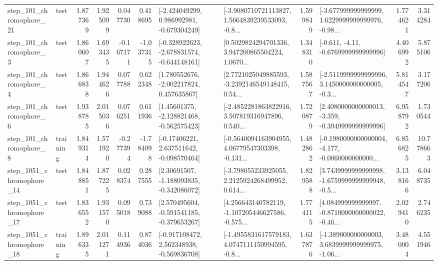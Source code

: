 \begin{tabular}{llrrrrllrlrr}
  step\_101\_chromophore\_21 &      test &      1.877369 &    1.925099 &      0.047730 &  0.418695 &   [-2.424049299, 0.986992981, -0.679304249] &  [-3.9080710721113827, 1.5664839239533093, -0.8... &       1.599849 &  [-3.677999999999999, 1.6229999999999976, -0.98... &            1.774621 &          3.314284 \\
   step\_101\_chromophore\_3 &      test &      1.860607 &    1.693435 &     -0.167171 & -1.037315 &  [-0.328922623, -2.678831574, -0.644148161] &  [0.5029824294701336, 3.947200865504224, 1.0670... &       1.348310 &               [-0.611, -4.11, -0.6769999999999996] &            4.406992 &          5.875106 \\
   step\_101\_chromophore\_4 &      test &      1.866838 &    1.944626 &      0.077788 &  0.622348 &    [1.780552676, -2.002217824, 0.457635867] &  [2.7721025049885593, -3.2392146549148415, 0.54... &       1.587567 &  [-2.5119999999999996, 3.1450000000000005, -0.3... &            5.814547 &          3.177206 \\
   step\_101\_chromophore\_6 &      test &      1.938785 &    2.015036 &      0.076251 &  0.611936 &    [1.45601375, -2.128821468, -0.562575423] &  [-2.4852281863822916, 3.507819316947896, 0.540... &       1.720879 &  [2.4080000000000013, -3.359, -0.3949999999999996] &            6.958792 &          1.730544 \\
   step\_101\_chromophore\_8 &  training &      1.849314 &    1.571920 &     -0.277394 & -1.784098 &    [-0.17406221, 2.637511642, -0.098570464] &  [-0.5640094163904955, 4.06779547303398, -0.131... &       1.482862 &  [-0.1980000000000004, -4.177, -0.0060000000000... &            6.856825 &         10.778663 \\
 step\_1051\_chromophore\_14 &      test &      1.848851 &    1.877225 &      0.028374 &  0.287555 &    [2.30691507, -1.188093835, -0.342086072] &  [-3.798055233925055, 2.2125924268499952, 0.614... &       1.829588 &  [3.7439999999999998, -1.6759999999999948, -0.5... &            3.138166 &          6.048735 \\
 step\_1051\_chromophore\_17 &      test &      1.836552 &    1.931570 &      0.095018 &  0.739088 &   [2.570495604, -0.591541185, -0.379653267] &  [4.256643140782119, -1.107205446627586, -0.575... &       1.774115 &  [4.084999999999997, -0.8710000000000022, -0.46... &            2.029410 &          2.746235 \\
 step\_1051\_chromophore\_18 &  training &      1.896335 &    2.011271 &      0.114936 &  0.874036 &   [-0.917108472, 2.562348938, -0.569836708] &  [-1.4955831617579183, 4.0747111150994595, -0.8... &       1.637876 &  [-1.389000000000003, 3.6839999999999975, -1.06... &            3.480004 &          4.551946 \\

\end{tabular}
